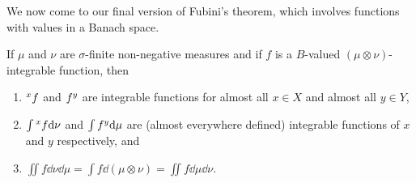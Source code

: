 We now come to our final version of Fubini's theorem, which involves functions with values in a Banach space.

\begin{theorem}[Fubini]
If $\mu$ and $\nu$ are $\sigma$-finite non-negative measures and if $f$ is a $B$-valued $(\mu\otimes\nu)$-integrable function, then
\begin{enumerate}[label=\arabic*)]
    \item $\xsec{f}{x}$ and $\ysec{f}{y}$ are integrable functions for almost all $x\in X$ and almost all $y\in Y$,

    \item $\int\xsec{f}{x}\dd\nu$ and $\int\ysec{f}{y}\dd\mu$ are (almost everywhere defined) integrable functions of $x$ and $y$ respectively, and

    \item $\iint f\dd\nu\dd\mu=\int f\dd(\mu\otimes\nu)=\iint f\dd\mu\dd\nu$.
\end{enumerate}
\end{theorem}

